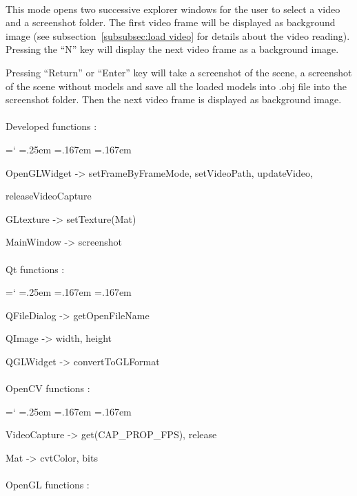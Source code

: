 \documentclass[12pt]{report}
\DeclareRobustCommand*{\ttfamily}{
  \origttfamily
  \hyphenchar\font=`\-\relax
  \fontdimen3\font=.25em\relax
  \fontdimen4\font=.167em\relax
  \fontdimen7\font=.167em\relax
}
\newenvironment{code}{\ttfamily}{}
\begin{document}
\paragraph{}
	This mode opens two successive explorer windows for the user to select a video and a screenshot folder. The first video frame will be displayed as background image (see subsection~\ref{subsubsec:load video} for details about the video reading). Pressing the ``N'' key will display the next video frame as a background image.
	
	Pressing ``Return'' or ``Enter'' key will take a screenshot of the scene, a screenshot of the scene without models and save all the loaded models into .obj file into the screenshot folder. Then the next video frame is displayed as background image.

\paragraph{}
	Developed functions :

	\begin{code}
	OpenGLWidget -> setFrameByFrameMode, setVideoPath, updateVideo,
	
	releaseVideoCapture
	
	GLtexture -> setTexture(Mat)

	MainWindow -> screenshot
	\end{code}

\paragraph{}
	Qt functions :

	\begin{code}
	QFileDialog -> getOpenFileName

	QImage -> width, height

	QGLWidget -> convertToGLFormat
	\end{code}

\paragraph{}
	OpenCV functions :

	\begin{code}
	VideoCapture -> get(CAP\_PROP\_FPS), release

	Mat -> cvtColor, bits
	\end{code}

\paragraph{}
	OpenGL functions :
\end{document}

